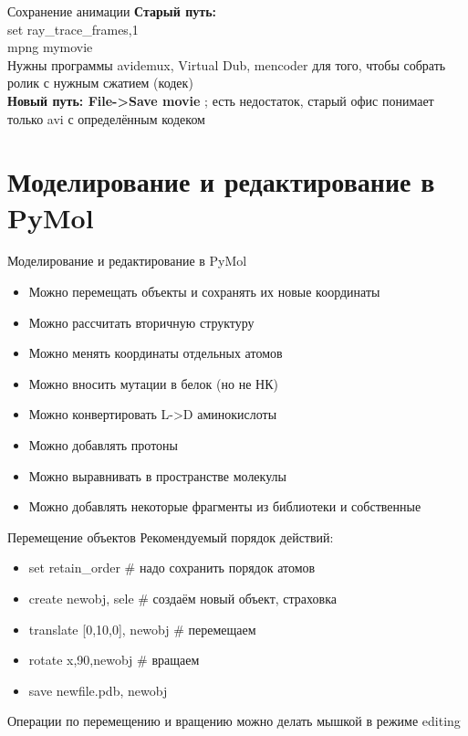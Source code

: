 	   \begin{frame}{Сохранение анимации}
		   \textbf{Старый путь: }\\
		   \textcolor{blue!40!white}{  set ray\_trace\_frames,1}\\
		   \textcolor{blue!40!white}{mpng mymovie}\\
		    Нужны программы avidemux, Virtual Dub, mencoder для того, чтобы собрать ролик с нужным сжатием (кодек)\\

			\textbf{Новый путь: File->Save movie }; есть недостаток, старый офис понимает только avi с определённым кодеком
		\end{frame}

		\section{Моделирование и редактирование в PyMol }

		\begin{frame}{Моделирование и редактирование в PyMol}
			\begin{itemize}
				\item Можно перемещать объекты и сохранять их новые координаты
				\item	Можно рассчитать вторичную структуру
				\item	Можно менять координаты отдельных атомов
				\item	Можно вносить мутации в белок (но не НК)
				\item	Можно конвертировать L->D аминокислоты
				\item	Можно добавлять протоны
				\item	Можно выравнивать в пространстве молекулы
				\item	Можно добавлять некоторые фрагменты из библиотеки и собственные
			\end{itemize}
		\end{frame}

		\begin{frame}{Перемещение объектов}
			Рекомендуемый порядок действий:\\
			\begin{itemize}
				\item \textcolor{blue!40!white}{set retain\_order} \# надо сохранить порядок атомов
				\item \textcolor{blue!40!white}{create newobj, sele} \# создаём новый объект, страховка
				\item \textcolor{blue!40!white}{translate [0,10,0], newobj} \# перемещаем
				\item \textcolor{blue!40!white}{rotate x,90,newobj} \# вращаем
				\item \textcolor{blue!40!white}{save newfile.pdb, newobj}
			\end{itemize}
			Операции по перемещению и вращению можно делать мышкой в режиме editing
		\end{frame}

